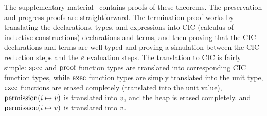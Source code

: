 The supplementary material~\cite{verussupplementary} contains proofs of these theorems.
The preservation and progress proofs are straightforward.
The termination proof works by translating the declarations, types, and expressions
into CIC (calculus of inductive constructions) declarations and terms,
and then proving that the CIC declarations and terms are well-typed
and proving a simulation between the CIC reduction steps and the $e$ evaluation steps.
The translation to CIC is fairly simple:
$\textrm{spec}$ and $\textrm{proof}$ function types are translated into corresponding
CIC function types, while $\textrm{exec}$ function types are simply translated into the unit type,
$\textrm{exec}$ functions are erased completely (translated into the unit value),
\ifextended
$\textrm{permission}(i \mapsto v)$ is translated into $v$, and the heap is erased completely.
\else
and $\textrm{permission}(i \mapsto v)$ is translated into $v$.
\fi








